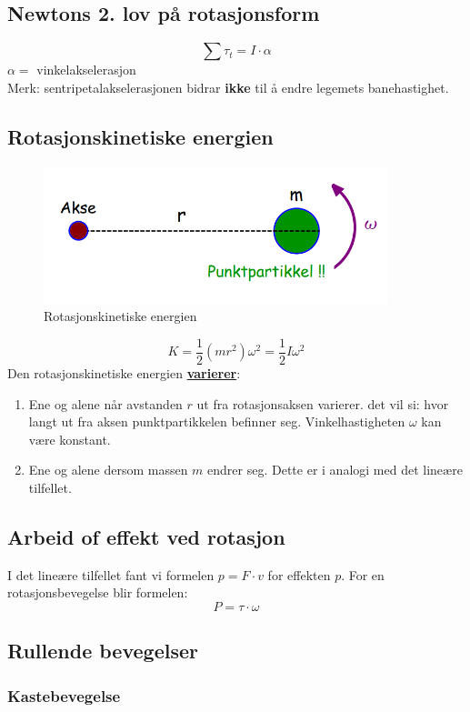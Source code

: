 \documentclass[12pt]{article}
\begin{document}
\subsection{Newtons 2. lov på rotasjonsform}
$$\sum \tau_t = I\cdot \alpha$$
$\alpha =$ vinkelakselerasjon\\
Merk: sentripetalakselerasjonen bidrar \textbf{ikke} til å endre legemets banehastighet.


\subsection{Rotasjonskinetiske energien}
\begin{figure} [H]
    \centering
    \includegraphics[height = 4cm]{images/rotation_kinetic.png}
    \caption{Rotasjonskinetiske energien}
\end{figure}
$$K = \frac{1}{2}(mr^2)\omega^2 = \frac{1}{2}I\omega^2$$
Den rotasjonskinetiske energien \underline{\textbf{varierer}}:
\begin{enumerate}
    \item Ene og alene når avstanden $r$ ut fra rotasjonsaksen varierer. det vil si: hvor langt ut fra aksen punktpartikkelen befinner seg. Vinkelhastigheten $\omega$ kan være konstant.
    \item Ene og alene dersom massen $m$ endrer seg. Dette er i analogi med det lineære tilfellet.
\end{enumerate}

\subsection{Arbeid of effekt ved rotasjon}
I det lineære tilfellet fant vi formelen $p = F\cdot v$ for effekten $p$.
For en rotasjonsbevegelse blir formelen:
$$P = \tau \cdot \omega$$

\subsection{Rullende bevegelser}
\subsubsection{Kastebevegelse}
\end{document}
